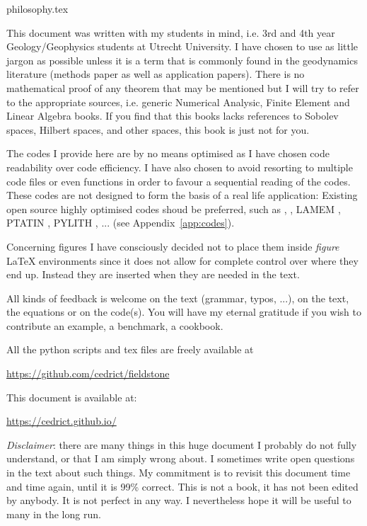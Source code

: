 \begin{flushright} {\tiny {\color{gray} philosophy.tex}} \end{flushright}

This document was written with my students in mind, i.e. 3rd and 4th year 
Geology/Geophysics students at Utrecht University. 
I have chosen to use as little jargon as possible unless it is a term that is 
commonly found in the geodynamics literature (methods paper as well as 
application papers). There is no mathematical proof of any theorem that may 
be mentioned but I will try to refer to the appropriate sources, i.e.
generic Numerical Analysic, Finite Element and 
Linear Algebra books. If you find that this books lacks references
to Sobolev spaces, Hilbert spaces, and other spaces, this book is just not for you.  

The codes I provide here are by no means optimised as I have chosen code readability 
over code efficiency. I have also chosen to avoid resorting to multiple code 
files or even functions in order to favour a sequential reading of the codes. 
These codes are not designed to form the basis of a real life application:
Existing open source highly optimised codes shoud be preferred, such as 
\aspect{} \cite{krhb12,hedg17}, \citcoms \cite{zhzm00,zhmt08}, LAMEM \cite{kapb16}, 
PTATIN \cite{mabl14,mabl15}, PYLITH \cite{aakw13}, ... (see Appendix~\ref{app:codes}).

Concerning figures I have consciously decided not to place them inside {\sl figure} \LaTeX 
environments since it does not allow for complete control over where they end up. 
Instead they are inserted when they are needed in the text. 

All kinds of feedback is welcome on the text (grammar, typos, ...), on the text, the equations
or on the code(s). You will have my eternal gratitude if you wish to contribute an 
example, a benchmark, a cookbook. 

All the python scripts and tex files are freely available at 
\begin{center}
\url{https://github.com/cedrict/fieldstone}
\end{center}
This document is available at:
\begin{center}
\url{https://cedrict.github.io/}
\end{center}

{\sl Disclaimer}: there are many things in this huge document I probably do not fully understand, 
or that I am simply wrong about. I sometimes write open questions in the text about such 
things. My commitment is to revisit this document time and time again, until it is 99\% correct.
This is not a book, it has not been edited by anybody. It is not perfect in any way. 
I nevertheless hope it will be useful to many in the long run. 


